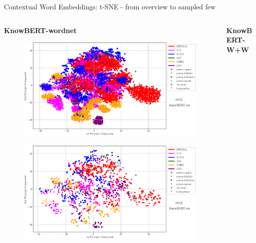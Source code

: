 \begin{frame}{Contextual Word Embeddings: t-SNE - from overview to sampled few}
    \begin{columns}
        \begin{column}{0.5\textwidth}
        \textbf{KnowBERT-wordnet}
            \begin{figure}
                \centering
                \includegraphics[height=0.15\textheight]{graphics/contextual_embeddings/tSNE_9512_1_2_knowbert_wordnetNone_title.eps}
            \end{figure}
            \begin{figure}
                \centering
                \includegraphics[height=0.55\textheight]{graphics/contextual_embeddings/tSNE_1024_1_2_knowbert_wordnet_annotated_title.eps}
            \end{figure}
        \end{column}
        \begin{column}{0.5\textwidth}
        \textbf{KnowBERT-W+W}
            \begin{figure}
                \centering

\end{figure}
\end{column}
\end{columns}
\end{frame}
